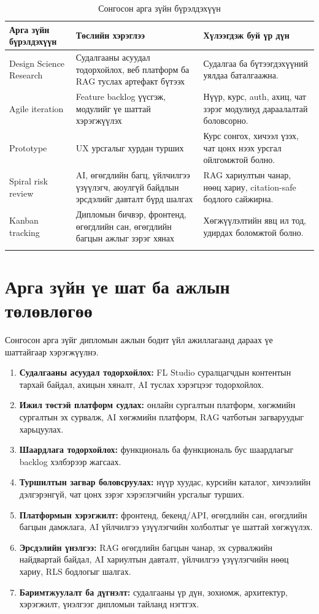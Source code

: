\begin{longtable}{|p{}|p{}|p{}|}
  \hline
  \textbf{Арга зүйн бүрэлдэхүүн} & \textbf{Төслийн хэрэглээ} & \textbf{Хүлээгдэж буй үр дүн} \\ \hline
  Design Science Research & Судалгааны асуудал тодорхойлох, веб платформ ба RAG туслах артефакт бүтээх & Судалгаа ба бүтээгдэхүүний уялдаа баталгаажна. \\ \hline
  Agile iteration & Feature backlog үүсгэж, модулийг үе шаттай хэрэгжүүлэх & Нүүр, курс, auth, ахиц, чат зэрэг модулиуд дараалалтай боловсорно. \\ \hline
  Prototype & UX урсгалыг хурдан турших & Курс сонгох, хичээл үзэх, чат цонх нээх урсгал ойлгомжтой болно. \\ \hline
  Spiral risk review & AI, өгөгдлийн багц, үйлчилгээ үзүүлэгч, аюулгүй байдлын эрсдэлийг давталт бүрд шалгах & RAG хариултын чанар, нөөц хариу, citation-safe бодлого сайжирна. \\ \hline
  Kanban tracking & Дипломын бичвэр, фронтенд, өгөгдлийн сан, өгөгдлийн багцын ажлыг зэрэг хянах & Хөгжүүлэлтийн явц ил тод, удирдах боломжтой болно. \\ \hline
  \caption{Сонгосон арга зүйн бүрэлдэхүүн}
  \label{tab:selected-methodology}
\end{longtable}

\section{Арга зүйн үе шат ба ажлын төлөвлөгөө}
Сонгосон арга зүйг дипломын ажлын бодит үйл ажиллагаанд дараах үе шаттайгаар хэрэгжүүлнэ.

\begin{enumerate}
  \item \textbf{Судалгааны асуудал тодорхойлох:} FL Studio суралцагчдын контентын тархай байдал, ахицын хяналт, AI туслах хэрэгцээг тодорхойлох.
  \item \textbf{Ижил төстэй платформ судлах:} онлайн сургалтын платформ, хөгжмийн сургалтын эх сурвалж, AI хөгжмийн платформ, RAG чатботын загваруудыг харьцуулах.
  \item \textbf{Шаардлага тодорхойлох:} функциональ ба функциональ бус шаардлагыг backlog хэлбэрээр жагсаах.
  \item \textbf{Туршилтын загвар боловсруулах:} нүүр хуудас, курсийн каталог, хичээлийн дэлгэрэнгүй, чат цонх зэрэг хэрэглэгчийн урсгалыг турших.
  \item \textbf{Платформын хэрэгжилт:} фронтенд, бекенд/API, өгөгдлийн сан, өгөгдлийн багцын дамжлага, AI үйлчилгээ үзүүлэгчийн холболтыг үе шаттай хөгжүүлэх.
  \item \textbf{Эрсдэлийн үнэлгээ:} RAG өгөгдлийн багцын чанар, эх сурвалжийн найдвартай байдал, AI хариултын давталт, үйлчилгээ үзүүлэгчийн нөөц хариу, RLS бодлогыг шалгах.
  \item \textbf{Баримтжуулалт ба дүгнэлт:} судалгааны үр дүн, зохиомж, архитектур, хэрэгжилт, үнэлгээг дипломын тайланд нэгтгэх.
\end{enumerate}

